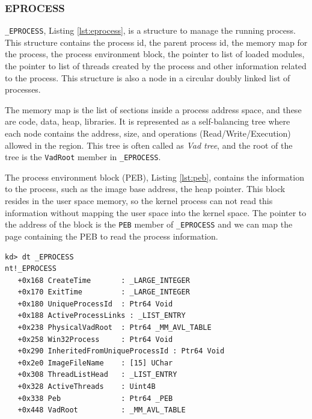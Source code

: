 \subsubsection[EPROCESS]{EPROCESS}

\texttt{\_EPROCESS}, Listing \ref{lst:eprocess}, is a structure to manage the
running process. This structure contains the process id, the parent process id,
the memory map for the process, the process environment block, the pointer to
list of loaded modules, the pointer to list of threads created by the process
and other information related to the process.  This structure is also a node in
a circular doubly linked list of processes.

The memory map is the list of sections inside a process address space, and
these are code, data, heap, libraries. It is represented as a self-balancing
tree where each node contains the address, size, and operations
(Read/Write/Execution) allowed in the region. This tree is often called as
\textit{Vad tree}, and the root of the tree is the \texttt{VadRoot} member in
\texttt{\_EPROCESS}.

The process environment block (PEB), Listing \ref{lst:peb}, contains the
information to the process, such as the image base address, the heap pointer.
This block resides in the user space memory, so the kernel process can not read
this information without mapping the user space into the kernel space. The
pointer to the address of the block is the \texttt{PEB} member of
\texttt{\_EPROCESS} and we can map the page containing the PEB to read the
process information.

\begin{lstlisting}[language=windbg,lable={lst:eprocess},caption=\texttt{\_EPROCESS} in Windows 7,float,floatplacement=H]
kd> dt _EPROCESS
nt!_EPROCESS
   +0x168 CreateTime       : _LARGE_INTEGER
   +0x170 ExitTime         : _LARGE_INTEGER
   +0x180 UniqueProcessId  : Ptr64 Void
   +0x188 ActiveProcessLinks : _LIST_ENTRY
   +0x238 PhysicalVadRoot  : Ptr64 _MM_AVL_TABLE
   +0x258 Win32Process     : Ptr64 Void
   +0x290 InheritedFromUniqueProcessId : Ptr64 Void
   +0x2e0 ImageFileName    : [15] UChar
   +0x308 ThreadListHead   : _LIST_ENTRY
   +0x328 ActiveThreads    : Uint4B
   +0x338 Peb              : Ptr64 _PEB
   +0x448 VadRoot          : _MM_AVL_TABLE
\end{lstlisting}

